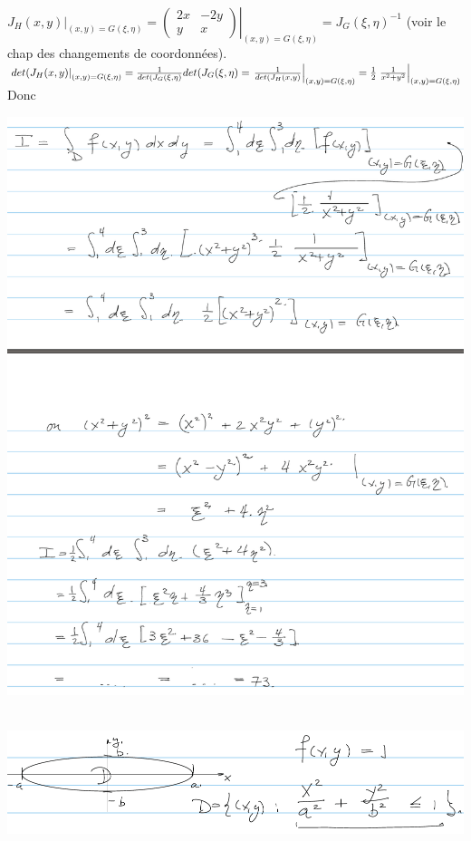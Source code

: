 \documentclass[12pt,a4paper]{article}
\begin{document}
\\
$\left.J_H(x,y)\right|_{(x,y) = G(\xi, \eta)} = \left.\begin{pmatrix}
	2x & -2y\\
	y & x
\end{pmatrix}\right|_{(x,y) = G(\xi, \eta)} = J_G(\xi,\eta)^{-1}$ (voir le chap des changements de coordonnées).\\
$\left.det(J_H(x,y)\right|_{(x,y) = G(\xi, \eta)} = \frac{1}{det(J_G(\xi,\eta)}\\
det(J_G(\xi,\eta) = \left.\frac{1}{det(J_H(x,y)}\right|_{(x,y) = G(\xi, \eta)} = \frac{1}{2}\left.\frac{1}{x^2+y^2}\right|_{(x,y) = G(\xi, \eta)}$\\
Donc
\begin{center}
	\includegraphics[scale=0.4]{images/chgt_coord_ex_2}
\end{center}
\\
\includegraphics[scale=0.5]{images/ellipse}\\
\end{document}

